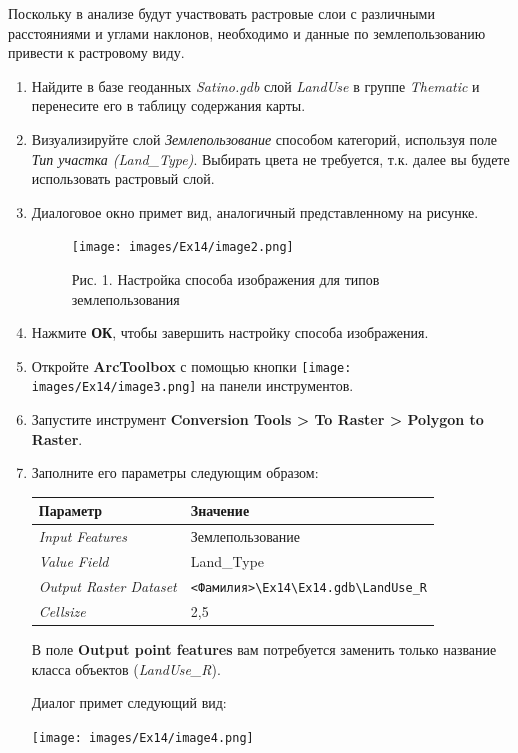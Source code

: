 \documentclass[12pt,]{book}
\begin{document}
Поскольку в анализе будут участвовать растровые слои с различными расстояниями и углами наклонов, необходимо и данные по землепользованию привести к растровому виду.

\begin{enumerate}
\def\labelenumi{\arabic{enumi}.}
\item
  Найдите в базе геоданных \emph{Satino.gdb} слой \emph{LandUse} в группе \emph{Thematic} и перенесите его в таблицу содержания карты.
\item
  Визуализируйте слой \emph{Землепользование} способом категорий, используя поле \emph{Тип участка (Land\_Type)}. Выбирать цвета не требуется, т.к. далее вы будете использовать растровый слой.
\item
  Диалоговое окно примет вид, аналогичный представленному на рисунке.

  \begin{figure}
  \centering
  \texttt{[image: images/Ex14/image2.png]}
  \caption{Рис. 1. Настройка способа изображения для типов землепользования}
  \end{figure}
\item
  Нажмите \textbf{ОК}, чтобы завершить настройку способа изображения.
\item
  Откройте \textbf{ArcToolbox} с помощью кнопки \texttt{[image: images/Ex14/image3.png]} на панели инструментов.
\item
  Запустите инструмент \textbf{Conversion Tools \textgreater{} To Raster \textgreater{} Polygon to Raster}.
\item
  Заполните его параметры следующим образом:

  \begin{longtable}[]{@{}ll@{}}
  \toprule
  Параметр & Значение\tabularnewline
  \midrule
  \endhead
  \emph{Input Features} & Землепользование\tabularnewline
  \emph{Value Field} & Land\_Type\tabularnewline
  \emph{Output Raster Dataset} & \texttt{\textless{}Фамилия\textgreater{}\textbackslash{}Ex14\textbackslash{}Ex14.gdb\textbackslash{}LandUse\_R}\tabularnewline
  \emph{Cellsize} & 2,5\tabularnewline
  \bottomrule
  \end{longtable}

  В поле \textbf{Output point features} вам потребуется заменить только название класса объектов (\emph{LandUse\_R}).

  Диалог примет следующий вид:

  \texttt{[image: images/Ex14/image4.png]}


\end{enumerate}
\end{document}
